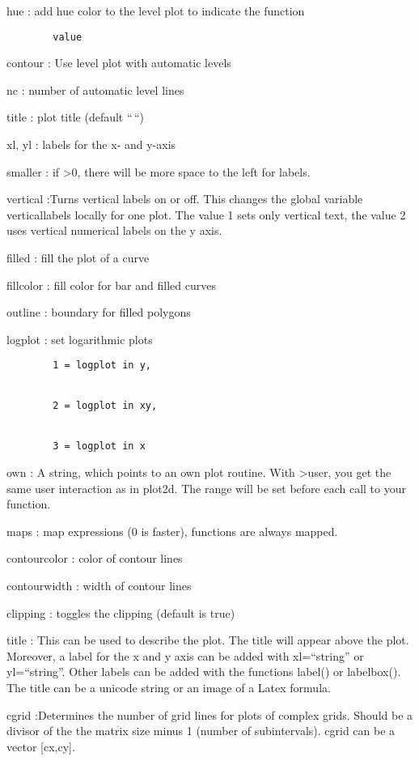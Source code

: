 \documentclass[
]{book}
\begin{document}
hue : add hue color to the level plot to indicate the function

\begin{verbatim}
        value
\end{verbatim}

contour : Use level plot with automatic levels

nc : number of automatic level lines

title : plot title (default ``\,``)

xl, yl : labels for the x- and y-axis

smaller : if \textgreater0, there will be more space to the left for labels.

vertical :Turns vertical labels on or off. This changes the global variable verticallabels locally for one plot. The value 1 sets only vertical text, the value 2 uses vertical numerical labels on the y axis.

filled : fill the plot of a curve

fillcolor : fill color for bar and filled curves

outline : boundary for filled polygons

logplot : set logarithmic plots

\begin{verbatim}
        1 = logplot in y,


        2 = logplot in xy,


        3 = logplot in x
\end{verbatim}

own : A string, which points to an own plot routine. With \textgreater user, you get the same user interaction as in plot2d. The range will be set before each call to your function.

maps : map expressions (0 is faster), functions are always mapped.

contourcolor : color of contour lines

contourwidth : width of contour lines

clipping : toggles the clipping (default is true)

title : This can be used to describe the plot. The title will appear above the plot. Moreover, a label for the x and y axis can be added with xl=``string'' or yl=``string''. Other labels can be added with the functions label() or labelbox(). The title can be a unicode string or an image of a Latex formula.

cgrid :Determines the number of grid lines for plots of complex grids. Should be a divisor of the the matrix size minus 1 (number of subintervals). cgrid can be a vector {[}cx,cy{]}.
\end{document}
